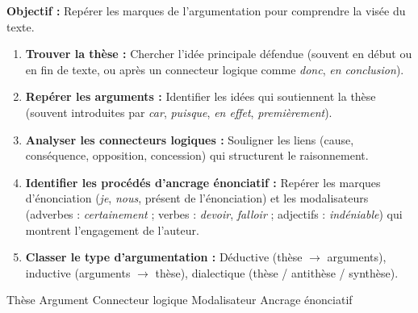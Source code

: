 \documentclass[11pt]{article}
\newcommand{\cle}[1]{{\popxbold\color{popdark}#1}}
\begin{document}
\begin{methode}
\textbf{Objectif :} Repérer les marques de l'argumentation pour comprendre la visée du texte.
\begin{enumerate}
    \item \textbf{Trouver la thèse :} Chercher l'idée principale défendue (souvent en début ou en fin de texte, ou après un connecteur logique comme \emph{donc}, \emph{en conclusion}).
    \item \textbf{Repérer les arguments :} Identifier les idées qui soutiennent la thèse (souvent introduites par \emph{car}, \emph{puisque}, \emph{en effet}, \emph{premièrement}).
    \item \textbf{Analyser les connecteurs logiques :} Souligner les liens (cause, conséquence, opposition, concession) qui structurent le raisonnement.
    \item \textbf{Identifier les procédés d'ancrage énonciatif :} Repérer les marques d'énonciation (\emph{je}, \emph{nous}, présent de l'énonciation) et les modalisateurs (adverbes : \emph{certainement} ; verbes : \emph{devoir}, \emph{falloir} ; adjectifs : \emph{indéniable}) qui montrent l'engagement de l'auteur.
    \item \textbf{Classer le type d'argumentation :} Déductive (thèse $\to$ arguments), inductive (arguments $\to$ thèse), dialectique (thèse / antithèse / synthèse).
\end{enumerate}
\cle{Thèse} \cle{Argument} \cle{Connecteur logique} \cle{Modalisateur} \cle{Ancrage énonciatif}
\end{methode}
\end{document}
